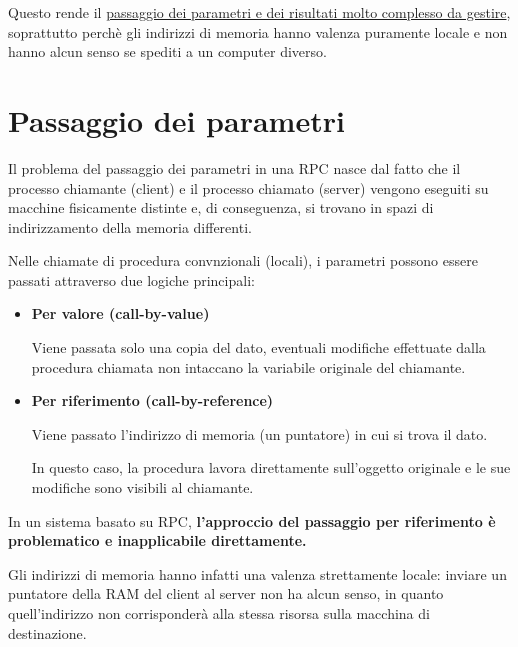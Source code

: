 Questo rende il \uline{passaggio dei parametri e dei risultati molto complesso da gestire}, soprattutto perchè gli indirizzi di memoria hanno valenza puramente locale e non hanno alcun senso se spediti a un computer diverso.


\section{Passaggio dei parametri}
Il problema del passaggio dei parametri in una RPC nasce dal fatto che il processo chiamante (client) e il processo chiamato (server) vengono eseguiti su macchine fisicamente distinte e, di conseguenza, si trovano in spazi di indirizzamento della memoria differenti.

Nelle chiamate di procedura convnzionali (locali), i parametri possono essere passati attraverso due logiche principali:
\begin{itemize}
    \item \textbf{Per valore (call-by-value)}

    Viene passata solo una copia del dato, eventuali modifiche effettuate dalla procedura chiamata non intaccano la variabile originale del chiamante.
    \item \textbf{Per riferimento (call-by-reference)}
    
    Viene passato l'indirizzo di memoria (un puntatore) in cui si trova il dato.

    In questo caso, la procedura lavora direttamente sull'oggetto originale e le sue modifiche sono visibili al chiamante.
\end{itemize}

In un sistema basato su RPC, \textbf{l'approccio del passaggio per riferimento è problematico e inapplicabile direttamente.}

Gli indirizzi di memoria hanno infatti una valenza strettamente locale: inviare un puntatore della RAM del client al server non ha alcun senso, in quanto quell'indirizzo non corrisponderà alla stessa risorsa sulla macchina di destinazione.

